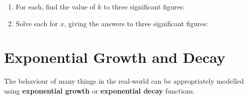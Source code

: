 \documentclass[
  11pt,
  openany]{book}
\begin{document}
\begin{enumerate}
    \item For each, find the value of $k$ to three significant figures: \faCalculator
    \vspace{-0.2cm}
    \begin{enumerate}
    \end{enumerate}
    \item Solve each for $x$, giving the answers to three significant figures: \faCalculator
    \vspace{-0.2cm}
    \begin{enumerate}
    \end{enumerate}
\end{enumerate}

\vspace{-0.2cm}

\pagebreak

\section{Exponential Growth and Decay}\label{exponential-growth-and-decay}

\vspace{-0.5cm}

The behaviour of many things in the real-world can be appropriately modelled using \textcolor{PineGreen}{\textbf{exponential growth}} or \textcolor{PineGreen}{\textbf{exponential decay}} functions.
\end{document}

